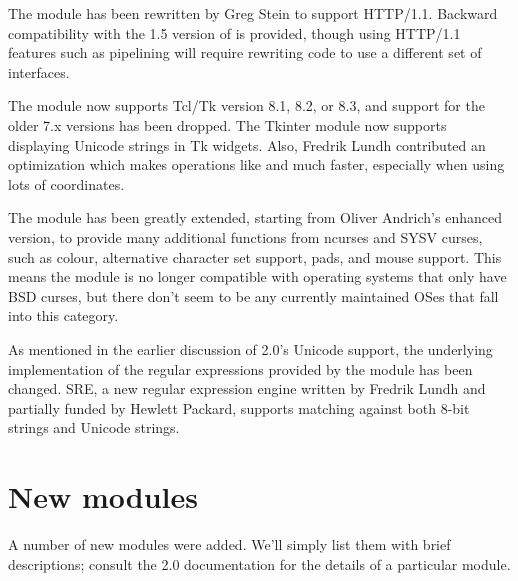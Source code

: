 \documentclass{howto}
\begin{document}
The  module has been rewritten by Greg Stein to
support HTTP/1.1.  Backward compatibility with the 1.5 version of
 is provided, though using HTTP/1.1 features such as
pipelining will require rewriting code to use a different set of
interfaces.

The  module now supports Tcl/Tk version 8.1, 8.2, or
8.3, and support for the older 7.x versions has been dropped.  The
Tkinter module now supports displaying Unicode strings in Tk widgets.
Also, Fredrik Lundh contributed an optimization which makes operations
like  and  much faster,
especially when using lots of coordinates.

The  module has been greatly extended, starting from
Oliver Andrich's enhanced version, to provide many additional
functions from ncurses and SYSV curses, such as colour, alternative
character set support, pads, and mouse support.  This means the module
is no longer compatible with operating systems that only have BSD
curses, but there don't seem to be any currently maintained OSes that
fall into this category.

As mentioned in the earlier discussion of 2.0's Unicode support, the
underlying implementation of the regular expressions provided by the
 module has been changed.  SRE, a new regular expression
engine written by Fredrik Lundh and partially funded by Hewlett
Packard, supports matching against both 8-bit strings and Unicode
strings.

\section{New modules}

A number of new modules were added.  We'll simply list them with brief
descriptions; consult the 2.0 documentation for the details of a
particular module.
\end{document}
